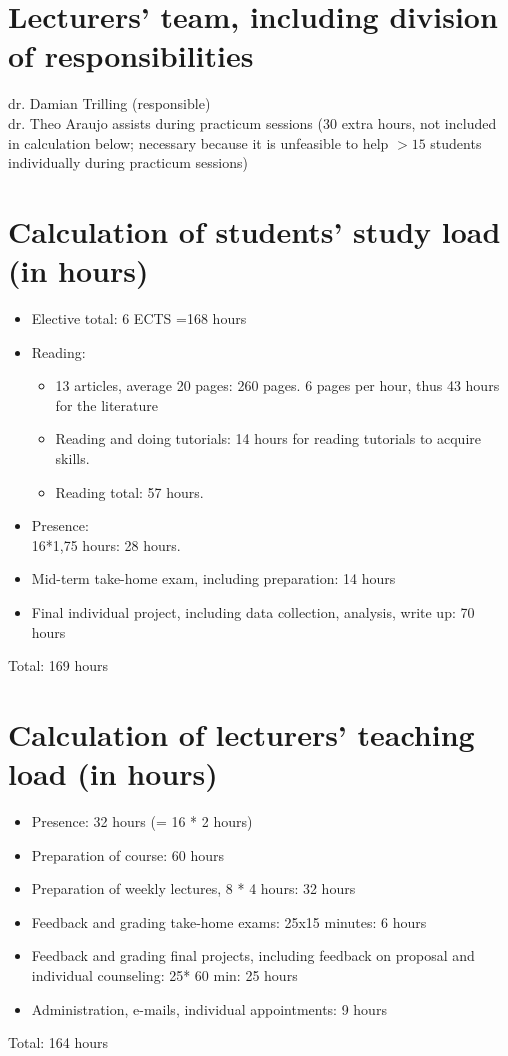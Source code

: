 \documentclass[a4paper,12pt]{report}
\begin{document}
\chapter{Lecturers' team, including division of responsibilities}
dr. Damian Trilling (responsible)\\
dr. Theo Araujo assists during practicum sessions (30 extra hours, not included in calculation below; necessary because it is unfeasible to help $>15$ students individually during practicum sessions)


\chapter{Calculation of students' study load (in hours)}
\begin{itemize}

\item Elective total: 6 ECTS =168 hours
\item Reading: 
\begin{itemize}
\item 13 articles, average 20 pages: 260 pages. 6 pages per hour, thus 43 hours for the literature
\item Reading and doing tutorials: 14 hours for reading tutorials to acquire skills.
\item Reading total: 57 hours.
\end{itemize}
\item Presence: \\16*1,75 hours: 28 hours.
\item Mid-term take-home exam, including preparation: 14 hours
\item Final individual project, including data collection, analysis, write up: 70 hours
\end{itemize}

Total: 169 hours



\chapter{Calculation of lecturers' teaching load (in hours)}
\begin{itemize}
\item Presence: 32 hours (= 16 * 2 hours)
\item Preparation of course: 60 hours
\item Preparation of weekly lectures, 8 * 4 hours: 32 hours
\item Feedback and grading take-home exams: 25x15 minutes: 6 hours
\item Feedback and grading final projects, including feedback on proposal and individual counseling: 25* 60 min: 25 hours 
\item Administration, e-mails, individual appointments: 9 hours
\end{itemize}
Total: 164 hours
\end{document}
